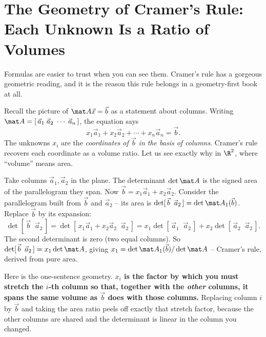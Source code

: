 \section{The Geometry of Cramer's Rule: Each Unknown Is a Ratio of Volumes}

Formulas are easier to trust when you can see them. Cramer's rule has a gorgeous geometric reading,
and it is the reason this rule belongs in a geometry-first book at all.

Recall the picture of $\mat A\vec x=\vec b$ as a statement about columns. Writing $\mat
A=[\,\vec a_1\;\vec a_2\;\cdots\;\vec a_n\,]$, the equation says
\[
x_1\vec a_1+x_2\vec a_2+\cdots+x_n\vec a_n=\vec b.
\]
The unknowns $x_i$ are the \emph{coordinates of $\vec b$ in the basis of columns}. Cramer's rule
recovers each coordinate as a volume ratio. Let us see exactly why in $\R^2$, where ``volume'' means
area.

Take columns $\vec a_1,\vec a_2$ in the plane. The determinant $\det\mat A$ is the signed area of the
parallelogram they span. Now $\vec b=x_1\vec a_1+x_2\vec a_2$. Consider the parallelogram built from
$\vec b$ and $\vec a_2$ -- its area is $\det[\,\vec b\;\;\vec a_2\,]=\det\mat A_1(\vec b)$. Replace
$\vec b$ by its expansion:
\[
\det[\,\vec b\;\;\vec a_2\,]=\det[\,x_1\vec a_1+x_2\vec a_2\;\;\vec a_2\,]
= x_1\det[\,\vec a_1\;\;\vec a_2\,]+x_2\det[\,\vec a_2\;\;\vec a_2\,].
\]
The second determinant is zero (two equal columns). So $\det[\,\vec b\;\;\vec a_2\,]=x_1\det\mat A$,
giving $x_1=\det\mat A_1(\vec b)/\det\mat A$ -- Cramer's rule, derived from pure area.

\begin{intuitionbox}
Here is the one-sentence geometry. \textbf{$x_i$ is the factor by which you must stretch the $i$-th
column so that, together with the \emph{other} columns, it spans the same volume as $\vec b$ does with
those columns.} Replacing column $i$ by $\vec b$ and taking the area ratio peels off exactly that
stretch factor, because the other columns are shared and the determinant is linear in the column you
changed.
\end{intuitionbox}

